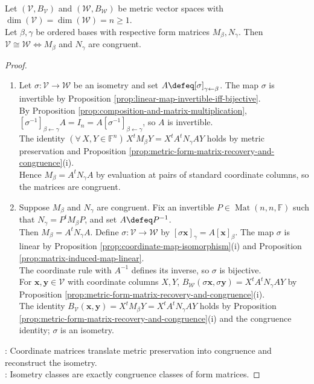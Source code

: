\begin{proposition} \label{prop:metric-spaces-isometric-iff-congruent-matrices} \\
Let $(\mathcal{V},B_{\mathcal{V}})$ and $(\mathcal{W},B_{\mathcal{W}})$ be metric vector spaces with $\dim(\mathcal{V})=\dim(\mathcal{W})=n\geq1$.\\
Let $\beta,\gamma$ be ordered bases with respective form matrices $M_{\beta},N_{\gamma}$. Then $\mathcal{V}\cong\mathcal{W}\Longleftrightarrow M_{\beta}$ and $N_{\gamma}$ are congruent.
\begin{proof}
\begin{enumerate}[label=\roman*.]
\setlength{\itemsep}{0pt}
\item[$(\Rightarrow)$] Let $\sigma:\mathcal{V}\to\mathcal{W}$ be an isometry and set $A\defeq[\sigma]_{\gamma\leftarrow\beta}$. The map $\sigma$ is invertible by Proposition \ref{prop:linear-map-invertible-iff-bijective}.\\
By Proposition \ref{prop:composition-and-matrix-multiplication}, $[\sigma^{-1}]_{\beta\leftarrow\gamma}A=I_n=A[\sigma^{-1}]_{\beta\leftarrow\gamma}$, so $A$ is invertible.\\
The identity $(\forall\,X,Y\in\mathbb{F}^n)\,X^tM_{\beta}Y=X^tA^tN_{\gamma}AY$ holds by metric preservation and Proposition \ref{prop:metric-form-matrix-recovery-and-congruence}(i).\\
Hence $M_{\beta}=A^tN_{\gamma}A$ by evaluation at pairs of standard coordinate columns, so the matrices are congruent.
\item[$(\Leftarrow)$] Suppose $M_{\beta}$ and $N_{\gamma}$ are congruent. Fix an invertible $P\in\operatorname{Mat}(n,n,\mathbb{F})$ such that $N_{\gamma}=P^tM_{\beta}P$, and set $A\defeq P^{-1}$.\\
Then $M_{\beta}=A^tN_{\gamma}A$. Define $\sigma:\mathcal{V}\to\mathcal{W}$ by $[\sigma\mathbf{x}]_{\gamma}=A[\mathbf{x}]_{\beta}$. The map $\sigma$ is linear by Proposition \ref{prop:coordinate-map-isomorphism}(i) and Proposition \ref{prop:matrix-induced-map-linear}.\\
The coordinate rule with $A^{-1}$ defines its inverse, so $\sigma$ is bijective.\\
For $\mathbf{x},\mathbf{y}\in\mathcal{V}$ with coordinate columns $X,Y$, $B_{\mathcal{W}}(\sigma\mathbf{x},\sigma\mathbf{y})=X^tA^tN_{\gamma}AY$ by Proposition \ref{prop:metric-form-matrix-recovery-and-congruence}(i).\\
The identity $B_{\mathcal{V}}(\mathbf{x},\mathbf{y})=X^tM_{\beta}Y=X^tA^tN_{\gamma}AY$ holds by Proposition \ref{prop:metric-form-matrix-recovery-and-congruence}(i) and the congruence identity; $\sigma$ is an isometry.
\end{enumerate}
: Coordinate matrices translate metric preservation into congruence and reconstruct the isometry.\\
: Isometry classes are exactly congruence classes of form matrices.
\end{proof}
\end{proposition}

